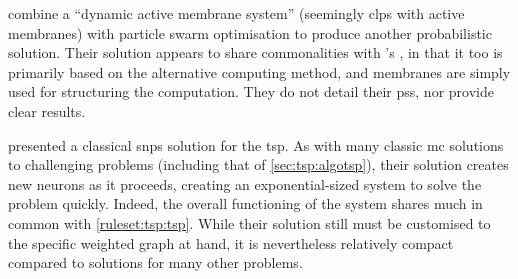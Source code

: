 
\citeauthor{Wei2019} \cite{Wei2019} combine a \enquote{dynamic active membrane system} (seemingly \gls{clps} with active membranes) with particle swarm optimisation \cite{Sun2016} to produce another probabilistic solution.  Their solution appears to share commonalities with \citeauthor{Nishida2006}'s \cite{Nishida2006}, in that it too is primarily based on the alternative computing method, and membranes are simply used for structuring the computation.  They do not detail their \glspl{ps}, nor provide clear results.



\citeauthor{Zhang2019} \cite{Zhang2019} presented a classical \gls{snps} solution for the \gls{tsp}.  As with many classic \gls{mc} solutions to challenging problems \cite{Paun1999a} (including that of \cref{sec:tsp:algotsp}), their solution creates new neurons as it proceeds, creating an exponential-sized system to solve the problem quickly.  Indeed, the overall functioning of the system shares much in common with \cref{ruleset:tsp:tsp}.  While their solution still must be customised to the specific weighted graph at hand, it is nevertheless relatively compact compared to solutions for many other problems.

